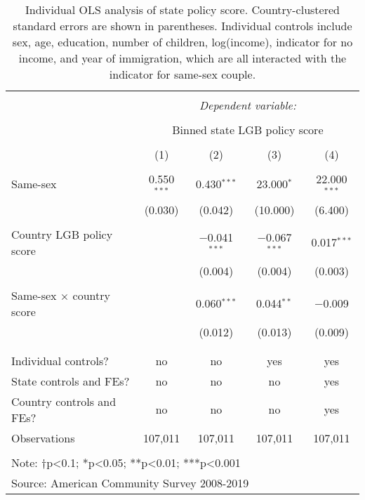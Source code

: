 \documentclass[
  11pt,
]{article}
\begin{document}
\begin{table}[!htbp] \centering 
  \caption{Individual OLS analysis of state policy score. Country-clustered standard errors are shown in parentheses. Individual controls include sex, age, education, number of children, log(income), indicator for no income, and year of immigration, which are all interacted with the indicator for same-sex couple.} 
  \label{tab:ols} 
\begin{tabular}{@{\extracolsep{5pt}}lcccc} 
\\[-1.8ex]\hline 
\hline \\[-1.8ex] 
 & \multicolumn{4}{c}{\textit{Dependent variable:}} \\ 
\cline{2-5} 
\\[-1.8ex] & \multicolumn{4}{c}{Binned state LGB policy score} \\ 
\\[-1.8ex] & (1) & (2) & (3) & (4)\\ 
\hline \\[-1.8ex] 
 Same-sex & 0.550$^{***}$ & 0.430$^{***}$ & 23.000$^{*}$ & 22.000$^{***}$ \\ 
  & (0.030) & (0.042) & (10.000) & (6.400) \\ 
  & & & & \\ 
 Country LGB policy score &  & $-$0.041$^{***}$ & $-$0.067$^{***}$ & 0.017$^{***}$ \\ 
  &  & (0.004) & (0.004) & (0.003) \\ 
  & & & & \\ 
 Same-sex × country score &  & 0.060$^{***}$ & 0.044$^{**}$ & $-$0.009 \\ 
  &  & (0.012) & (0.013) & (0.009) \\ 
  & & & & \\ 
\hline \\[-1.8ex] 
Individual controls? & no & no & yes & yes \\ 
State controls and FEs? & no & no & no & yes \\ 
Country controls and FEs? & no & no & no & yes \\ 
Observations & 107,011 & 107,011 & 107,011 & 107,011 \\ 
\hline 
\hline \\[-1.8ex] 
\multicolumn{5}{l}{Note: †p<0.1; *p<0.05; **p<0.01; ***p<0.001} \\ 
\multicolumn{5}{l}{Source: American Community Survey 2008-2019} \\ 
\end{tabular} 
\end{table}
\end{document}
